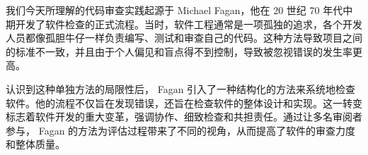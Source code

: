 我们今天所理解的代码审查实践起源于 Michael Fagan，他在 20 世纪 70 年代中期开发了软件检查的正式流程。当时，软件工程通常是一项孤独的追求，各个开发人员都像孤胆牛仔一样负责编写、测试和审查自己的代码。这种方法导致项目之间的标准不一致，并且由于个人偏见和盲点得不到控制，导致被忽视错误的发生率更高。

认识到这种单独方法的局限性后， Fagan 引入了一种结构化的方法来系统地检查软件。他的流程不仅旨在发现错误，还旨在检查软件的整体设计和实现。这一转变标志着软件开发的重大变革，强调协作、细致检查和共担责任。通过让多名审阅者参与， Fagan 的方法为评估过程带来了不同的视角，从而提高了软件的审查力度和整体质量。
























